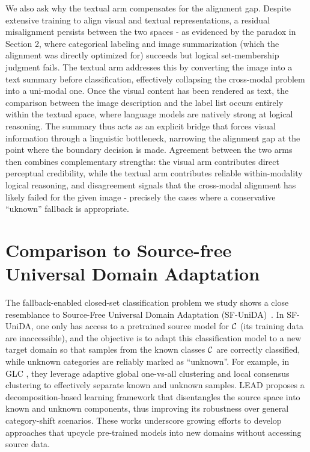 \documentclass[10pt]{article} %
\begin{document}
We also ask why the textual arm compensates for the alignment gap. Despite extensive training to align visual and textual representations, a residual misalignment persists between the two spaces - as evidenced by the paradox in Section 2, where categorical labeling and image summarization (which the alignment was directly optimized for) succeeds but logical set-membership judgment fails. The textual arm addresses this by converting the image into a text summary before classification, effectively collapsing the cross-modal problem into a uni-modal one. Once the visual content has been rendered as text, the comparison between the image description and the label list occurs entirely within the textual space, where language models are natively strong at logical reasoning. The summary thus acts as an explicit bridge that forces visual information through a linguistic bottleneck, narrowing the alignment gap at the point where the boundary decision is made. Agreement between the two arms then combines complementary strengths: the visual arm contributes direct perceptual credibility, while the textual arm contributes reliable within-modality logical reasoning, and disagreement signals that the cross-modal alignment has likely failed for the given image - precisely the cases where a conservative ``uknown'' fallback is appropriate.

\section{Comparison to Source-free Universal Domain Adaptation}\label{sec:comparison}
The fallback-enabled closed-set classification problem we study shows a close resemblance to Source-Free Universal Domain Adaptation (SF-UniDA)~\citep{UDA_2019_CVPR, liang2021umad,qu2023upcycling,qu2024lead}.
In SF-UniDA, one only has access to a pretrained source model for ${\cal C}$ (its training data are inaccessible), and the objective is to adapt this classification model to a new target domain so that samples from the known classes ${\cal C}$ are correctly classified, while unknown categories are reliably marked as ``unknown''.
For example, in GLC \citep{qu2023upcycling}, they leverage adaptive global one-vs-all clustering and local consensus clustering to effectively separate known and unknown samples.
LEAD \citep{qu2024lead} proposes a decomposition-based learning framework that disentangles the source space into known and unknown components, thus improving its robustness over general category-shift scenarios.
These works underscore growing efforts to develop approaches that upcycle pre-trained models into new domains without accessing source data.
\end{document}
